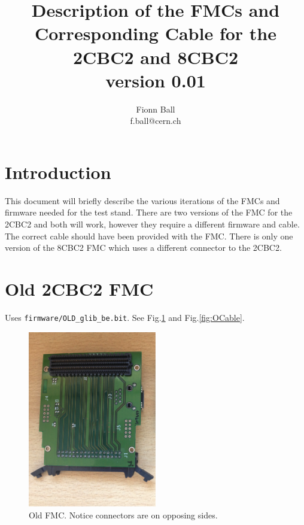 \documentclass[11pt,a4paper]{article}
\begin{document}
\title{Description of the FMCs and Corresponding Cable for the 2CBC2 and 8CBC2 \\ version 0.01}

\author{Fionn Ball\\
	f.ball@cern.ch}

	\maketitle
	\tableofcontents

	\section{Introduction}
	This document will briefly describe the various iterations of the FMCs and firmware needed for the test stand. There are two versions of the FMC for the 2CBC2 and both will work, however they require a different firmware and cable. The correct cable should have been provided with the FMC. There is only one version of the 8CBC2 FMC which uses a different connector to the 2CBC2. 
	
	\section{Old 2CBC2 FMC}
	Uses \verb|firmware/OLD_glib_be.bit|. See Fig.\ref{fig:OFMC} and Fig.\ref{fig:OCable}.
	
\begin{figure} [htbp] 
        \centering
                \includegraphics[width=0.5\textwidth]{fig/OLD_FMC.png}
                \caption{Old FMC. Notice connectors are on opposing sides.}
                \label{fig:OFMC}
        \end{figure}
        
\end{document}
